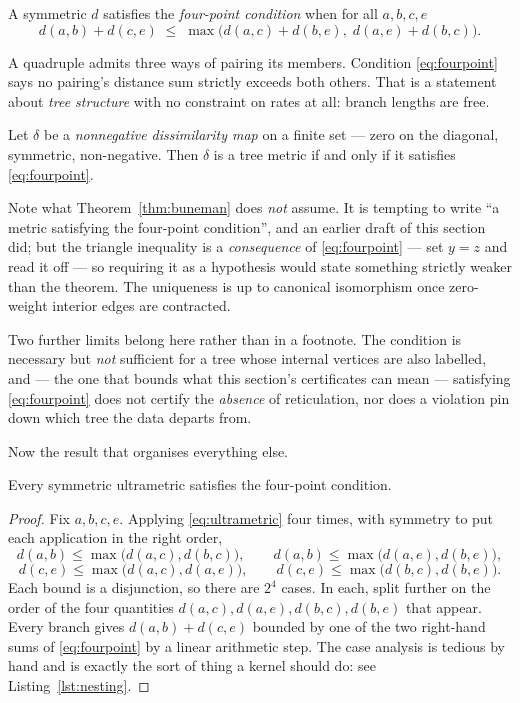 \begin{definition}\label{def:fourpoint}
A symmetric $d$ satisfies the \emph{four-point condition} when for all
$a,b,c,e$
\begin{equation}\label{eq:fourpoint}
  d(a,b) + d(c,e) \;\le\;
  \max\!\big(d(a,c)+d(b,e),\; d(a,e)+d(b,c)\big).
\end{equation}
\end{definition}

A quadruple admits three ways of pairing its members. Condition
\eqref{eq:fourpoint} says no pairing's distance sum strictly exceeds both
others. That is a statement about \emph{tree structure} with no constraint on
rates at all: branch lengths are free.

\begin{theorem}\label{thm:buneman}
Let $\delta$ be a \emph{nonnegative dissimilarity map} on a finite set --- zero
on the diagonal, symmetric, non-negative. Then $\delta$ is a tree metric if and
only if it satisfies \eqref{eq:fourpoint}.
\end{theorem}

Note what Theorem~\ref{thm:buneman} does \emph{not} assume. It is tempting to
write ``a metric satisfying the four-point condition'', and an earlier draft of
this section did; but the triangle inequality is a \emph{consequence} of
\eqref{eq:fourpoint} --- set $y = z$ and read it off --- so requiring it as a
hypothesis would state something strictly weaker than the theorem. The
uniqueness is up to canonical isomorphism once zero-weight interior edges are
contracted.

Two further limits belong here rather than in a footnote. The condition is
necessary but \emph{not} sufficient for a tree whose internal vertices are also
labelled, and --- the one that bounds what this section's certificates can mean
--- satisfying \eqref{eq:fourpoint} does not certify the \emph{absence} of
reticulation, nor does a violation pin down which tree the data departs from.

Now the result that organises everything else.

\begin{theorem}\label{thm:nesting}
Every symmetric ultrametric satisfies the four-point condition.
\end{theorem}

\begin{proof}
Fix $a,b,c,e$. Applying \eqref{eq:ultrametric} four times, with symmetry to put
each application in the right order,
\[
  d(a,b) \le \max\!\big(d(a,c),d(b,c)\big), \qquad
  d(a,b) \le \max\!\big(d(a,e),d(b,e)\big),
\]
\[
  d(c,e) \le \max\!\big(d(a,c),d(a,e)\big), \qquad
  d(c,e) \le \max\!\big(d(b,c),d(b,e)\big).
\]
Each bound is a disjunction, so there are $2^4$ cases. In each, split further on
the order of the four quantities $d(a,c), d(a,e), d(b,c), d(b,e)$ that appear.
Every branch gives $d(a,b)+d(c,e)$ bounded by one of the two right-hand sums of
\eqref{eq:fourpoint} by a linear arithmetic step. The case analysis is tedious
by hand and is exactly the sort of thing a kernel should do: see
Listing~\ref{lst:nesting}.
\end{proof}

